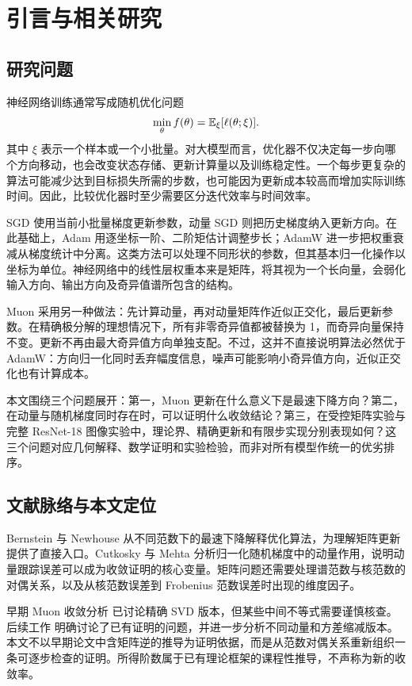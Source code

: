 \section{引言与相关研究}
\subsection{研究问题}
神经网络训练通常写成随机优化问题
\begin{equation}\label{eq:problem}
 \min_{\theta} f(\theta)=\mathbb E_{\xi}[\ell(\theta;\xi)].
\end{equation}
其中 $\xi$ 表示一个样本或一个小批量。对大模型而言，优化器不仅决定每一步向哪个方向移动，也会改变状态存储、更新计算量以及训练稳定性。一个每步更复杂的算法可能减少达到目标损失所需的步数，也可能因为更新成本较高而增加实际训练时间。因此，比较优化器时至少需要区分迭代效率与时间效率。

SGD 使用当前小批量梯度更新参数，动量 SGD 则把历史梯度纳入更新方向。在此基础上，Adam 用逐坐标一阶、二阶矩估计调整步长\citep{adam2015}；AdamW 进一步把权重衰减从梯度统计中分离\citep{adamw2019}。这类方法可以处理不同形状的参数，但其基本归一化操作以坐标为单位。神经网络中的线性层权重本来是矩阵，将其视为一个长向量，会弱化输入方向、输出方向及奇异值谱所包含的结构。

Muon 采用另一种做法：先计算动量，再对动量矩阵作近似正交化，最后更新参数\citep{jordan2024}。在精确极分解的理想情况下，所有非零奇异值都被替换为 1，而奇异向量保持不变。更新不再由最大奇异值方向单独支配。不过，这并不直接说明算法必然优于 AdamW：方向归一化同时丢弃幅度信息，噪声可能影响小奇异值方向，近似正交化也有计算成本。

本文围绕三个问题展开：第一，Muon 更新在什么意义下是最速下降方向？第二，在动量与随机梯度同时存在时，可以证明什么收敛结论？第三，在受控矩阵实验与完整 ResNet-18 图像实验中，理论界、精确更新和有限步实现分别表现如何？这三个问题对应几何解释、数学证明和实验检验，而非对所有模型作统一的优劣排序。

\subsection{文献脉络与本文定位}
Bernstein 与 Newhouse\citep{bernstein2024} 从不同范数下的最速下降解释优化算法，为理解矩阵更新提供了直接入口。Cutkosky 与 Mehta\citep{cutkosky2020} 分析归一化随机梯度中的动量作用，说明动量跟踪误差可以成为收敛证明的核心变量。矩阵问题还需要处理谱范数与核范数的对偶关系，以及从核范数误差到 Frobenius 范数误差时出现的维度因子。

早期 Muon 收敛分析\citep{lihong2025} 已讨论精确 SVD 版本，但某些中间不等式需要谨慎核查。后续工作\citep{chang2025} 明确讨论了已有证明的问题，并进一步分析不同动量和方差缩减版本。本文不以早期论文中含矩阵逆的推导为证明依据，而是从范数对偶关系重新组织一条可逐步检查的证明。所得阶数属于已有理论框架的课程性推导，不声称为新的收敛率。

